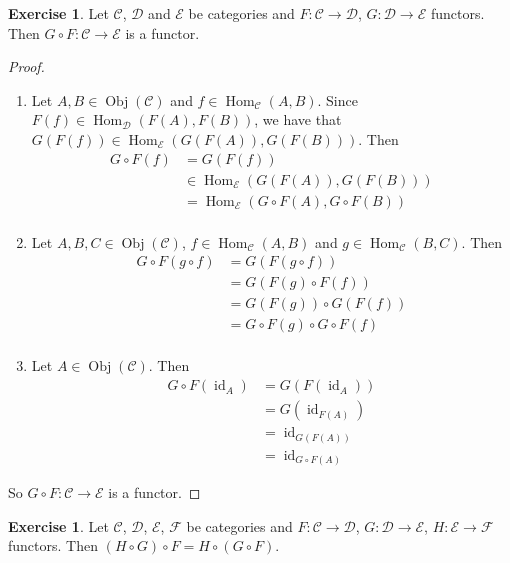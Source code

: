 \documentclass{book}
\theoremstyle{definition}
\newtheorem{ex}[definition]{Exercise}
\newcommand{\MC}{\mathcal{C}}
\newcommand{\MD}{\mathcal{D}}
\newcommand{\ME}{\mathcal{E}}
\newcommand{\MF}{\mathcal{F}}
\newcommand{\lex}[1]{\label{ex:#1}}
\DeclareMathOperator{\id}{id}
\DeclareMathOperator{\Obj}{Obj}
\DeclareMathOperator{\Hom}{Hom}
\DeclareMathOperator*{\0}{\mbf{0}}
\DeclareMathOperator*{\1}{\mbf{1}}
\begin{document}
	\begin{ex}  \lex{13007}
		Let $\MC$, $\MD$ and $\ME$ be categories and $F:\MC \rightarrow \MD$, $G: \MD \rightarrow \ME$ functors. Then  $G \circ F: \MC \rightarrow \ME$ is a functor.
	\end{ex}

	\begin{proof}\
		\begin{enumerate}
				\item Let $A, B \in \Obj(\MC)$ and $f \in \Hom_{\MC}(A,B)$. Since $F(f) \in \Hom_{\MD}(F(A), F(B))$, we have that $G(F(f)) \in \Hom_{\ME}(G(F(A)), G(F(B)))$. Then 
			\begin{align*}
				G \circ F (f) 
				& = G(F(f)) \\
				& \in \Hom_{\ME}(G(F(A)), G(F(B))) \\
				& =  \Hom_{\ME}(G \circ F(A), G \circ F (B)) \\
			\end{align*}
			\item Let $A,B, C \in \Obj(\MC)$, $f \in \Hom_{\MC}(A,B)$ and $g \in \Hom_{\MC}(B, C)$. Then 
			\begin{align*}
				G \circ F(g \circ f) 
				& = G (F (g \circ f)) \\
				& = G(F(g) \circ F(f)) \\
				& = G(F(g)) \circ G(F(f)) \\
				& = G \circ F (g) \circ G \circ F (f) \\
			\end{align*}
			\item Let $A \in \Obj(\MC)$. Then 
			\begin{align*}
				G \circ F(\id_{A})
				& = G(F(\id_A) )\\
				& = G(\id_{F(A)}) \\
				& = \id_{G(F(A))} \\
				& = \id_{G \circ F(A)} 
			\end{align*}
		\end{enumerate}
		So $G \circ F: \MC \rightarrow \ME$ is a functor. 
	\end{proof}

	\begin{ex}  \lex{13008}
		Let $\MC$, $\MD$, $\ME$, $\MF$ be categories and $F:\MC \rightarrow \MD$, $G : \MD \rightarrow \ME$, $H: \ME \rightarrow \MF$ functors. Then $(H \circ G) \circ F = H \circ (G \circ F)$.
	\end{ex}
\end{document}
